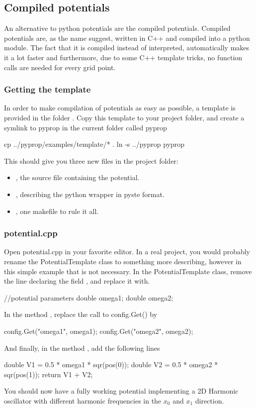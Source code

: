 \subsection{Compiled potentials}
An alternative to python potentials are the compiled potentials. Compiled potentials are, as the name suggest, written 
in C++ and compiled into a python module. The fact that it is compiled instead of interpreted, automatically makes it a
lot faster and furthermore, due to some C++ template tricks, no function calls are needed for every grid point. 

\subsubsection*{Getting the template}
In order to make compilation of potentials as easy as possible, a template is provided in the folder 
. Copy this template to your project folder, and create a symlink
to pyprop in the current folder called pyprop
\begin{bash}
	cp ../pyprop/examples/template/* .
	ln -s ../pyprop pyprop
\end{bash}
This should give you three new files in the project folder: 
\begin{itemize}
	\item {}, the source file containing the potential.
	\item {}, describing the python wrapper in pyste format.
	\item {}, one makefile to rule it all.
\end{itemize}

\subsubsection*{potential.cpp}
Open potential.cpp in your favorite editor. In a real project, you would probably rename the PotentialTemplate
class to something more describing, however in this simple example that is not necessary. 
In the PotentialTemplate class, remove the line declaring the field , and replace it with.
\begin{c++}
	//potential parameters
	double omega1;
	double omega2; 
\end{c++}
In the method , replace the call to config.Get() by
\begin{c++}
	config.Get("omega1", omega1);
	config.Get("omega2", omega2);
\end{c++}
And finally, in the method , add the following lines
\begin{c++}
	double V1 = 0.5 * omega1 * sqr(pos(0));
	double V2 = 0.5 * omega2 * sqr(pos(1));
	return V1 + V2;
\end{c++}
You should now have a fully working potential implementing a 2D Harmonic oscillator with different harmonic frequencies
in the $x_0$ and $x_1$ direction.

